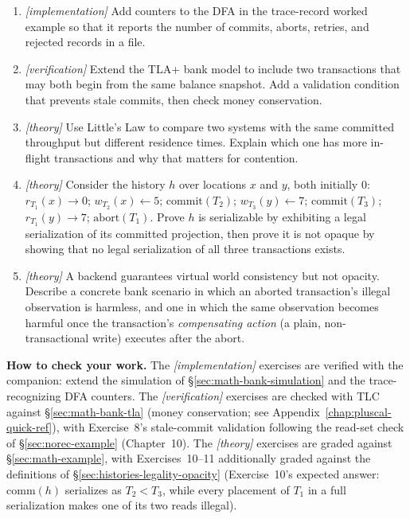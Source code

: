 \begin{enumerate}
State clearly whether the result changes if the two validation phases are correlated.
    \item \emph{[implementation]} Add counters to the DFA in the trace-record worked example so that it reports the number of commits, aborts, retries, and rejected records in a file.
    \item \emph{[verification]} Extend the TLA+ bank model to include two transactions that may both begin from the same balance snapshot. Add a validation condition that prevents stale commits, then check money conservation.
    \item \emph{[theory]} Use Little's Law to compare two systems with the same committed throughput but different residence times. Explain which one has more in-flight transactions and why that matters for contention.
    \item \emph{[theory]} Consider the history $h$ over locations $x$ and $y$, both initially $0$: $r_{T_1}(x)\!\to\!0$; $w_{T_2}(x)\!\leftarrow\!5$; $\mathrm{commit}(T_2)$; $w_{T_3}(y)\!\leftarrow\!7$; $\mathrm{commit}(T_3)$; $r_{T_1}(y)\!\to\!7$; $\mathrm{abort}(T_1)$. Prove $h$ is serializable by exhibiting a legal serialization of its committed projection, then prove it is not opaque by showing that no legal serialization of all three transactions exists.
    \item \emph{[theory]}\label{ex:vwc-vs-opacity} A backend guarantees virtual world consistency but not opacity. Describe a concrete bank scenario in which an aborted transaction's illegal observation is harmless, and one in which the same observation becomes harmful once the transaction's \emph{compensating action} (a plain, non-transactional write) executes after the abort.
\end{enumerate}

\textbf{How to check your work.} The \emph{[implementation]} exercises are
verified with the companion: extend the simulation of
\S\ref{sec:math-bank-simulation} and the trace-recognizing DFA counters.  The
\emph{[verification]} exercises are checked with TLC against
\S\ref{sec:math-bank-tla} (money conservation; see
Appendix~\ref{chap:pluscal-quick-ref}), with Exercise~8's stale-commit
validation following the read-set check of \S\ref{sec:norec-example}
(Chapter~10).  The
\emph{[theory]} exercises are graded against \S\ref{sec:math-example}, with
Exercises~10--11 additionally graded against the definitions of
\S\ref{sec:histories-legality-opacity} (Exercise~10's expected answer:
$\mathrm{comm}(h)$ serializes as $T_2 < T_3$, while every placement of $T_1$
in a full serialization makes one of its two reads illegal).

